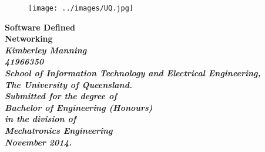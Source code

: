 \begin{titlepage}
\renewcommand{\baselinestretch}{1.0}
\begin{figure}[h]
\centering
\texttt{[image: ../images/UQ.jpg]}
\end{figure}
\begin{center}
\vspace*{35mm}
\Huge\bf
        Software Defined \\
        Networking \\
\vspace{20mm}
\large\sl
        Kimberley Manning \\
        41966350
                \bigskip\\
\rm
                School of Information Technology and Electrical Engineering,\\
                The University of Queensland.\\
\vspace{30mm}   
                Submitted for the degree of\\
                Bachelor of Engineering (Honours)
                \smallskip\\
\normalsize
                in the division of\\
                Mechatronics Engineering
                \medskip\\
\large
                November 2014.
\end{center}
\end{titlepage}

\pagestyle{fancy}
\fancyfoot{}
\fancyhead{}
\renewcommand{\headrulewidth}{0pt}
\fancyfoot[C] {\footnotesize \thepage}

\cleardoublepage

